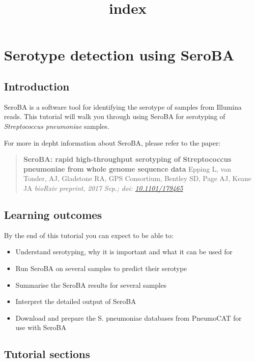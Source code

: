 \documentclass[11pt]{article}
\title{index}
\providecommand{\tightlist}{%
      \setlength{\itemsep}{0pt}\setlength{\parskip}{0pt}}
\begin{document}
    \hypertarget{serotype-detection-using-seroba}{%
\section{Serotype detection using
SeroBA}\label{serotype-detection-using-seroba}}

\hypertarget{introduction}{%
\subsection{Introduction}\label{introduction}}

SeroBA is a software tool for identifying the serotype of samples from
Illumina reads. This tutorial will walk you through using SeroBA for
serotyping of \textit{Streptococcus pneumoniae} samples.

For more in depht information about SeroBA, please refer to the paper:

\begin{quote}
\textbf{SeroBA: rapid high-throughput serotyping of Streptococcus
pneumoniae from whole genome sequence data} Epping L, van Tonder, AJ,
Gladstone RA, GPS Consortium, Bentley SD, Page AJ, Keane JA
\textit{bioRxiv preprint, 2017 Sep.; doi:
\href{https://www.biorxiv.org/content/early/2017/09/05/179465}{10.1101/179465}}
\end{quote}

\hypertarget{learning-outcomes}{%
\subsection{Learning outcomes}\label{learning-outcomes}}

By the end of this tutorial you can expect to be able to:

\begin{itemize}
\tightlist
\item
  Understand serotyping, why it is important and what it can be used for
\item
  Run SeroBA on several samples to predict their serotype
\item
  Summarise the SeroBA results for several samples
\item
  Interpret the detailed output of SeroBA
\item
  Download and prepare the S. pneumoniae databases from PneumoCAT for
  use with SeroBA
\end{itemize}

\hypertarget{tutorial-sections}{%
\subsection{Tutorial sections}\label{tutorial-sections}}
\end{document}
